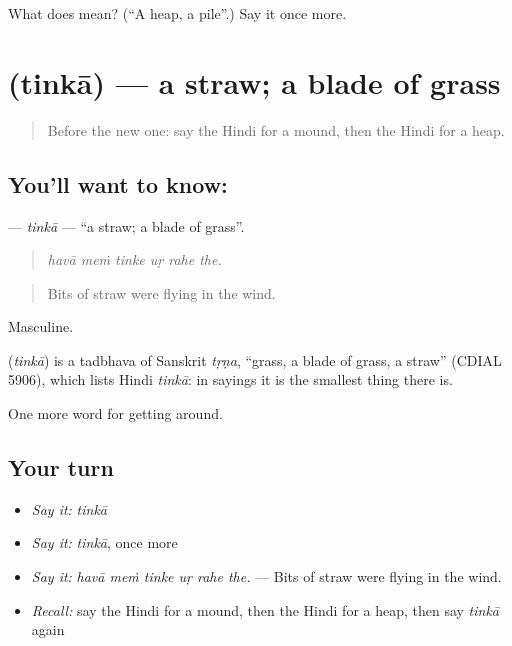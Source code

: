 \begin{tcolorbox}[breakable,colback=teal!4,colframe=teal!35!black,title={Before you move on}]
What does  mean? (\textquotedblleft{}A heap, a pile\textquotedblright{}.) Say it once more.
\end{tcolorbox}
\section[\texorpdfstring{\hi{तिनका} (tinkā)}{तिनका (tinkā)}]{ (tinkā) — a straw; a blade of grass}

\label{lesson:HI-C442-tinka}



\begin{quote}
Before the new one: say the Hindi for a mound, then the Hindi for a heap.
\end{quote}

\subsection*{You'll want to know: }
\textbf{} — \emph{tinkā} — \textquotedblleft{}a straw; a blade of grass\textquotedblright{}.

\begin{quote}
     
\end{quote}

\begin{quote}
\emph{havā meṁ tinke uṛ rahe the.}
\end{quote}

\begin{quote}
Bits of straw were flying in the wind.
\end{quote}

Masculine.

\begin{cousinweb}
\textbf{} (\emph{tinkā}) is a tadbhava of Sanskrit \emph{tṛṇa}, \textquotedblleft{}grass, a blade of grass, a straw\textquotedblright{} (CDIAL 5906), which lists Hindi \emph{tinkā}: in sayings it is the smallest thing there is.
\end{cousinweb}

\begin{grammarlens}[title={What you've built}]
One more word for getting around.
\end{grammarlens}

\subsection*{Your turn}
\begin{itemize}
\raggedright
  \item \emph{Say it:} \emph{tinkā}
  \item \emph{Say it:} \emph{tinkā}, once more
  \item \emph{Say it:} \emph{havā meṁ tinke uṛ rahe the.} — Bits of straw were flying in the wind.
  \item \emph{Recall:} say the Hindi for a mound, then the Hindi for a heap, then say \emph{tinkā} again
\end{itemize}

